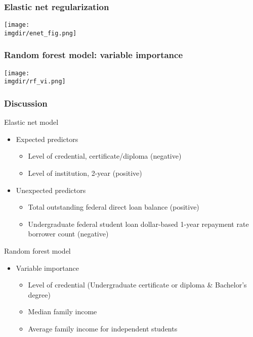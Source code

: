 \documentclass[aspectratio=169, t, 10pt]{beamer}
\begin{document}
\begin{frame}
  \frametitle{Elastic net regularization}
    \centering
        \texttt{[image: \\imgdir/enet\_fig.png]}
 \end{frame}

\begin{frame}
  \frametitle{Random forest model: variable importance}
    \centering
        \texttt{[image: \\imgdir/rf\_vi.png]}
 \end{frame}

\begin{frame}
  \frametitle{Discussion}
  \begin{block}{Elastic net model}
    \begin{itemize}
    \item Expected predictors 
      \begin{itemize}
         \item Level of credential, certificate/diploma (negative)
         \item Level of institution, 2-year (positive)
      \end{itemize}
    \item Unexpected predictors
       \begin{itemize}
         \item Total outstanding federal direct loan balance (positive)
         \item Undergraduate federal student loan dollar-based 1-year
           repayment rate borrower count (negative)
      \end{itemize}    
    \end{itemize}
  \end{block}
  \begin{block}{Random forest model}
    \begin{itemize}
    \item Variable importance
      \begin{itemize}
        \item Level of credential (Undergraduate certificate or
          diploma \& Bachelor's degree)
        \item Median family income
        \item Average family income for independent students
       \end{itemize}
    \end{itemize}
   \end{block} 
\end{frame}
 
\end{document}
